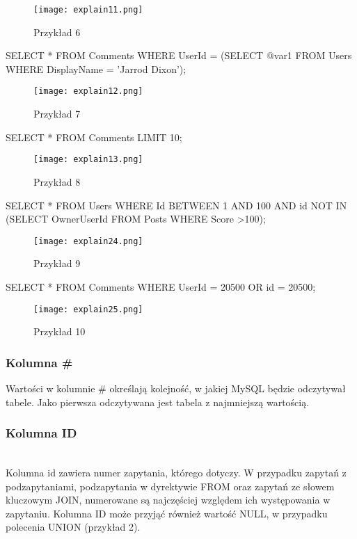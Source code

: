 \begin{figure}[H]
	\center
	\texttt{[image: explain11.png]} 
	\caption{Przykład 6}
\end{figure}
\begin{spverbatim}
	SELECT * FROM Comments WHERE UserId = (SELECT @var1 FROM Users WHERE DisplayName = 'Jarrod Dixon');
\end{spverbatim}
\begin{figure}[H]
	\center
	\texttt{[image: explain12.png]} 
	\caption{Przykład 7}
\end{figure}
\begin{spverbatim}
SELECT * FROM Comments LIMIT 10;
\end{spverbatim}
\begin{figure}[H]
	\center
	\texttt{[image: explain13.png]} 
	\caption{Przykład 8}
\end{figure}
\begin{spverbatim}
	SELECT * FROM Users WHERE Id BETWEEN 1 AND 100 AND 
	id NOT IN (SELECT OwnerUserId FROM Posts WHERE Score >100);
\end{spverbatim}
\begin{figure}[h!]
	\center
	\texttt{[image: explain24.png]} 
	\caption{Przykład 9}
\end{figure}
\begin{spverbatim}
	SELECT * FROM Comments WHERE UserId = 20500 OR id = 20500;
\end{spverbatim}
\begin{figure}[H]
	\center
	\texttt{[image: explain25.png]} 
	\caption{Przykład 10}
\end{figure}

\subsubsection{Kolumna \#}
Wartości w kolumnie \# określają kolejność, w jakiej MySQL będzie odczytywał tabele. Jako pierwsza odczytywana jest tabela z najmniejszą wartością.

\subsubsection{Kolumna ID}\leavevmode\\
Kolumna id zawiera numer zapytania, którego dotyczy. W przypadku zapytań z podzapytaniami, podzapytania w dyrektywie FROM oraz zapytań ze słowem kluczowym JOIN, numerowane są najczęściej względem ich występowania w zapytaniu. Kolumna ID może przyjąć również wartość NULL, w przypadku polecenia UNION (przykład 2).

